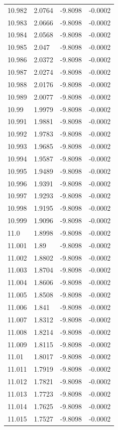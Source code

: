 \begin{tabular}{llll}
10.982 & 2.0764 & -9.8098 & -0.0002 \\
10.983 & 2.0666 & -9.8098 & -0.0002 \\
10.984 & 2.0568 & -9.8098 & -0.0002 \\
10.985 & 2.047 & -9.8098 & -0.0002 \\
10.986 & 2.0372 & -9.8098 & -0.0002 \\
10.987 & 2.0274 & -9.8098 & -0.0002 \\
10.988 & 2.0176 & -9.8098 & -0.0002 \\
10.989 & 2.0077 & -9.8098 & -0.0002 \\
10.99 & 1.9979 & -9.8098 & -0.0002 \\
10.991 & 1.9881 & -9.8098 & -0.0002 \\
10.992 & 1.9783 & -9.8098 & -0.0002 \\
10.993 & 1.9685 & -9.8098 & -0.0002 \\
10.994 & 1.9587 & -9.8098 & -0.0002 \\
10.995 & 1.9489 & -9.8098 & -0.0002 \\
10.996 & 1.9391 & -9.8098 & -0.0002 \\
10.997 & 1.9293 & -9.8098 & -0.0002 \\
10.998 & 1.9195 & -9.8098 & -0.0002 \\
10.999 & 1.9096 & -9.8098 & -0.0002 \\
11.0 & 1.8998 & -9.8098 & -0.0002 \\
11.001 & 1.89 & -9.8098 & -0.0002 \\
11.002 & 1.8802 & -9.8098 & -0.0002 \\
11.003 & 1.8704 & -9.8098 & -0.0002 \\
11.004 & 1.8606 & -9.8098 & -0.0002 \\
11.005 & 1.8508 & -9.8098 & -0.0002 \\
11.006 & 1.841 & -9.8098 & -0.0002 \\
11.007 & 1.8312 & -9.8098 & -0.0002 \\
11.008 & 1.8214 & -9.8098 & -0.0002 \\
11.009 & 1.8115 & -9.8098 & -0.0002 \\
11.01 & 1.8017 & -9.8098 & -0.0002 \\
11.011 & 1.7919 & -9.8098 & -0.0002 \\
11.012 & 1.7821 & -9.8098 & -0.0002 \\
11.013 & 1.7723 & -9.8098 & -0.0002 \\
11.014 & 1.7625 & -9.8098 & -0.0002 \\
11.015 & 1.7527 & -9.8098 & -0.0002 \\

\end{tabular}

